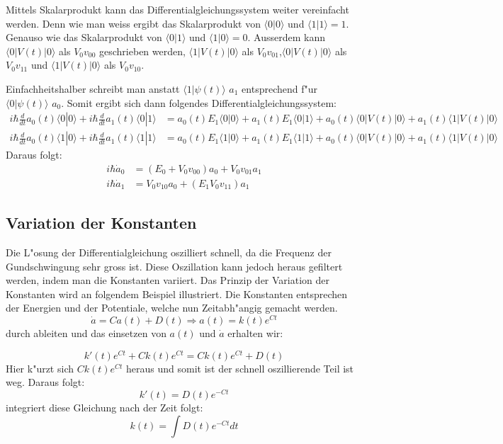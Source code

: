 \begin{refsection}
Mittels Skalarprodukt kann das Differentialgleichungssystem weiter
vereinfacht werden.
Denn wie man weiss ergibt das Skalarprodukt von $\langle0|0\rangle$
und $\langle1|1\rangle = 1$.
Genauso wie das Skalarprodukt von $\langle0|1\rangle$ und
$\langle1|0\rangle = 0$.
Ausserdem kann  $\langle0|V(t)|0\rangle$ als $V_{0}v_{00}$ geschrieben
werden, $\langle1|V(t)|0\rangle$ als $V_{0}v_{01}$,$\langle0|V(t)|0\rangle$
als $V_{0}v_{11}$ und $\langle1|V(t)|0\rangle$ als $V_{0}v_{10}$.

Einfachheitshalber schreibt man anstatt $\langle1|\psi(t)\rangle$ $a_1$
entsprechend f"ur $\langle0|\psi(t)\rangle$ $a_0$.
Somit ergibt sich dann folgendes Differentialgleichungssystem:
\begin{align*}
i\hbar\frac{d}{dt}a_{0}(t)\langle0|0\rangle +i\hbar\frac{d}{dt}a_{1}(t)\langle0|1\rangle&= a_{0}(t)E_{1}\langle0|0\rangle + a_{1}(t)E_{1}\langle0|1\rangle + a_{0}(t)\langle0|V(t)|0\rangle+ a_{1}(t)\langle1|V(t)|0\rangle
\\
i\hbar\frac{d}{dt}a_{0}(t)\langle1|0\rangle +i\hbar\frac{d}{dt}a_{1}(t)\langle1|1\rangle&= a_{0}(t)E_{1}\langle1|0\rangle + a_{1}(t)E_{1}\langle1|1\rangle + a_{0}(t)\langle0|V(t)|0\rangle+ a_{1}(t)\langle1|V(t)|0\rangle
\end{align*}
Daraus folgt:
\begin{align}
i\hbar\dot{a}_0&= (E_{0} + V_{0} v_{00}) a_{0} + V_{0} v_{01} a_{1}
\\
i\hbar\dot{a}_1&= V_{0} v_{10} a_{0} + (E_{1} V_{0} v_{11}) a_{1}
\end{align}

\subsection{Variation der Konstanten}
Die L"osung der Differentialgleichung oszilliert schnell, da die
Frequenz der Gundschwingung sehr gross ist.
Diese Oszillation kann jedoch heraus gefiltert werden, indem man die
Konstanten variiert.
Das Prinzip der Variation der Konstanten wird an folgendem Beispiel
illustriert.
Die Konstanten entsprechen der Energien und der Potentiale, welche nun
Zeitabh"angig gemacht werden.
\[
\dot{a} = C a(t) + D(t) \Rightarrow a(t) = k(t) e^{C t}
\] 
durch ableiten und das einsetzen von $ a(t)$ und  $ \dot{a} $ erhalten wir:

\[
k'(t) e^{C t} + C k(t) e^{C t} = C k(t) e^{C t} + D(t)
\] 
Hier k"urzt sich $ C k(t) e^{C t} $ heraus und somit ist der schnell
oszillierende Teil ist weg.
Daraus folgt:
\[
k'(t) = D(t) e^{-C t}
\] 
integriert diese Gleichung nach der Zeit folgt:
\[
k(t) = \int D(t) e^{-C t} dt 
\]


\end{refsection}
